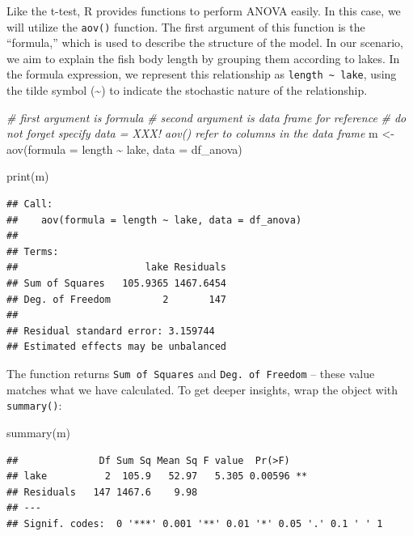\documentclass[
]{book}
\newenvironment{Shaded}{\begin{snugshade}}{\end{snugshade}}
\newcommand{\AttributeTok}[1]{\textcolor[rgb]{0.77,0.63,0.00}{#1}}
\newcommand{\CommentTok}[1]{\textcolor[rgb]{0.56,0.35,0.01}{\textit{#1}}}
\newcommand{\FunctionTok}[1]{\textcolor[rgb]{0.00,0.00,0.00}{#1}}
\newcommand{\NormalTok}[1]{#1}
\newcommand{\OtherTok}[1]{\textcolor[rgb]{0.56,0.35,0.01}{#1}}
\newcommand{\SpecialCharTok}[1]{\textcolor[rgb]{0.00,0.00,0.00}{#1}}
\begin{document}
Like the t-test, R provides functions to perform ANOVA easily. In this case, we will utilize the \texttt{aov()} function. The first argument of this function is the ``formula,'' which is used to describe the structure of the model. In our scenario, we aim to explain the fish body length by grouping them according to lakes. In the formula expression, we represent this relationship as \texttt{length\ \textasciitilde{}\ lake}, using the tilde symbol (\textasciitilde) to indicate the stochastic nature of the relationship.

\begin{Shaded}
\begin{Highlighting}[]
\CommentTok{\# first argument is formula}
\CommentTok{\# second argument is data frame for reference}
\CommentTok{\# do not forget specify data = XXX! aov() refer to columns in the data frame}
\NormalTok{m }\OtherTok{\textless{}{-}} \FunctionTok{aov}\NormalTok{(}\AttributeTok{formula =}\NormalTok{ length }\SpecialCharTok{\textasciitilde{}}\NormalTok{ lake,}
         \AttributeTok{data =}\NormalTok{ df\_anova)}

\FunctionTok{print}\NormalTok{(m)}
\end{Highlighting}
\end{Shaded}

\begin{verbatim}
## Call:
##    aov(formula = length ~ lake, data = df_anova)
## 
## Terms:
##                      lake Residuals
## Sum of Squares   105.9365 1467.6454
## Deg. of Freedom         2       147
## 
## Residual standard error: 3.159744
## Estimated effects may be unbalanced
\end{verbatim}

The function returns \texttt{Sum\ of\ Squares} and \texttt{Deg.\ of\ Freedom} -- these value matches what we have calculated. To get deeper insights, wrap the object with \texttt{summary()}:

\begin{Shaded}
\begin{Highlighting}[]
\FunctionTok{summary}\NormalTok{(m)}
\end{Highlighting}
\end{Shaded}

\begin{verbatim}
##              Df Sum Sq Mean Sq F value  Pr(>F)   
## lake          2  105.9   52.97   5.305 0.00596 **
## Residuals   147 1467.6    9.98                   
## ---
## Signif. codes:  0 '***' 0.001 '**' 0.01 '*' 0.05 '.' 0.1 ' ' 1
\end{verbatim}
\end{document}
